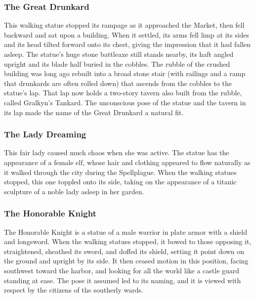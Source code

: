 \documentclass[10pt,a4paper,twoside,twocolumn,openany,nodeprecatedcode]{dndbook}
\begin{document}
\subsubsection{The Great Drunkard}
This walking statue stopped its rampage as it approached the Market, then fell backward and sat upon a building. When it settled, its arms fell limp at its sides and its head tilted forward onto its chest, giving the impression that it had fallen asleep. The statue's huge stone battleaxe still stands nearby, its haft angled upright and its blade half buried in the cobbles. The rubble of the crushed building was long ago rebuilt into a broad stone stair (with railings and a ramp that drunkards are often rolled down) that ascends from the cobbles to the statue's lap. That lap now holds a two-story tavern also built from the rubble, called Gralkyn's Tankard. The unconscious pose of the statue and the tavern in its lap made the name of the Great Drunkard a natural fit.
\subsubsection{The Lady Dreaming}
This fair lady caused much chaos when she was active. The statue has the appearance of a female elf, whose hair and clothing appeared to flow naturally as it walked through the city during the Spellplague. When the walking statues stopped, this one toppled onto its side, taking on the appearance of a titanic sculpture of a noble lady asleep in her garden.
\subsubsection{The Honorable Knight}
The Honorable Knight is a statue of a male warrior in plate armor with a shield and longsword. When the walking statues stopped, it bowed to those opposing it, straightened, sheathed its sword, and doffed its shield, setting it point down on the ground and upright by its side. It then ceased motion in this position, facing southwest toward the harbor, and looking for all the world like a castle guard standing at ease. The pose it assumed led to its naming, and it is viewed with respect by the citizens of the southerly wards.
\end{document}
